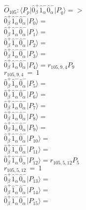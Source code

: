 \documentclass[14pt]{article}
\begin{document}
    $\hat{O}_{105}:  \langle{P_p}\vert \hat{0}_{\beta}^{+}\hat{1}_{\alpha}^{-}\hat{0}_{\alpha}^{-} \vert{P_q}\rangle => $ \\ 
    $ \hat{0}_{\beta}^{+}\hat{1}_{\alpha}^{-}\hat{0}_{\alpha}^{-} \vert{P_{0}}\rangle =  $ \\ 
    $ \hat{0}_{\beta}^{+}\hat{1}_{\alpha}^{-}\hat{0}_{\alpha}^{-} \vert{P_{1}}\rangle =  $ \\ 
    $ \hat{0}_{\beta}^{+}\hat{1}_{\alpha}^{-}\hat{0}_{\alpha}^{-} \vert{P_{2}}\rangle =  $ \\ 
    $ \hat{0}_{\beta}^{+}\hat{1}_{\alpha}^{-}\hat{0}_{\alpha}^{-} \vert{P_{3}}\rangle =  $ \\ 
    $ \hat{0}_{\beta}^{+}\hat{1}_{\alpha}^{-}\hat{0}_{\alpha}^{-} \vert{P_{4}}\rangle = {r}_{105,9,4}P_{9} $ \\ 
    ${r}_{105,9,4}\ =\ 1 $ \\ 
    $ \hat{0}_{\beta}^{+}\hat{1}_{\alpha}^{-}\hat{0}_{\alpha}^{-} \vert{P_{5}}\rangle =  $ \\ 
    $ \hat{0}_{\beta}^{+}\hat{1}_{\alpha}^{-}\hat{0}_{\alpha}^{-} \vert{P_{6}}\rangle =  $ \\ 
    $ \hat{0}_{\beta}^{+}\hat{1}_{\alpha}^{-}\hat{0}_{\alpha}^{-} \vert{P_{7}}\rangle =  $ \\ 
    $ \hat{0}_{\beta}^{+}\hat{1}_{\alpha}^{-}\hat{0}_{\alpha}^{-} \vert{P_{8}}\rangle =  $ \\ 
    $ \hat{0}_{\beta}^{+}\hat{1}_{\alpha}^{-}\hat{0}_{\alpha}^{-} \vert{P_{9}}\rangle =  $ \\ 
    $ \hat{0}_{\beta}^{+}\hat{1}_{\alpha}^{-}\hat{0}_{\alpha}^{-} \vert{P_{10}}\rangle =  $ \\ 
    $ \hat{0}_{\beta}^{+}\hat{1}_{\alpha}^{-}\hat{0}_{\alpha}^{-} \vert{P_{11}}\rangle =  $ \\ 
    $ \hat{0}_{\beta}^{+}\hat{1}_{\alpha}^{-}\hat{0}_{\alpha}^{-} \vert{P_{12}}\rangle = {r}_{105,5,12}P_{5} $ \\ 
    ${r}_{105,5,12}\ =\ 1 $ \\ 
    $ \hat{0}_{\beta}^{+}\hat{1}_{\alpha}^{-}\hat{0}_{\alpha}^{-} \vert{P_{13}}\rangle =  $ \\ 
    $ \hat{0}_{\beta}^{+}\hat{1}_{\alpha}^{-}\hat{0}_{\alpha}^{-} \vert{P_{14}}\rangle =  $ \\ 
    $ \hat{0}_{\beta}^{+}\hat{1}_{\alpha}^{-}\hat{0}_{\alpha}^{-} \vert{P_{15}}\rangle =  $ \\ 
    
\end{document}
